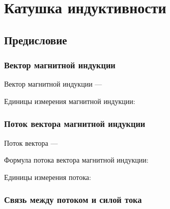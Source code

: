 \newpage

\section{Катушка индуктивности}

\subsection{Предисловие}

\subsubsection{Вектор магнитной индукции}

Вектор магнитной индукции --- \hrulefill

\hrulefill

\hrulefill

Единицы измерения магнитной индукции:



\subsubsection{Поток вектора магнитной индукции}

Поток вектора --- \hrulefill

\hrulefill

\hrulefill


Формула потока вектора магнитной индукции:


Единицы измерения потока:


\subsubsection{Связь между потоком и силой тока}

